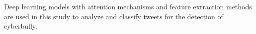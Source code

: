 Deep learning models with attention mechanisms and feature extraction methods are used in this study to analyze and classify tweets for the detection of cyberbully.
